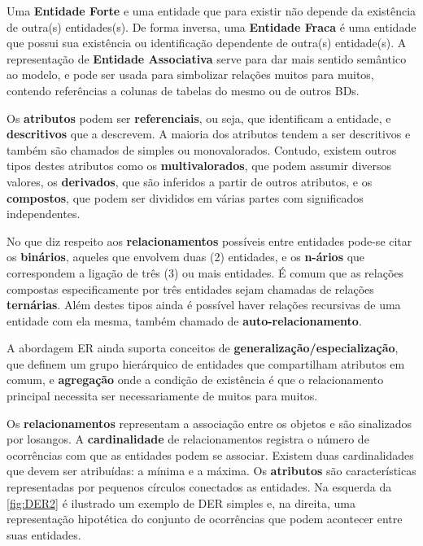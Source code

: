 Uma \textbf{Entidade Forte} e uma entidade que para existir não depende da existência de outra(s) entidades(s). 
De forma inversa, uma \textbf{Entidade Fraca} é uma entidade que possui sua existência ou identificação dependente de outra(s) entidade(s). 
A representação de \textbf{Entidade Associativa} serve para dar mais sentido semântico ao modelo, e pode ser usada para simbolizar relações muitos para muitos, contendo referências a colunas de tabelas do mesmo ou de outros \acp{BD}. 

Os \textbf{atributos} podem ser \textbf{referenciais}, ou seja, que identificam a entidade, e \textbf{descritivos} que a descrevem. 
A maioria dos atributos tendem a ser descritivos e também são chamados de simples ou monovalorados. 
Contudo, existem outros tipos destes atributos como os \textbf{multivalorados}, que podem assumir diversos valores, os \textbf{derivados}, que são inferidos a partir de outros atributos, e os \textbf{compostos}, que podem ser divididos em várias partes com significados independentes.

No que diz respeito aos \textbf{relacionamentos} possíveis entre entidades pode-se citar os \textbf{binários}, aqueles que envolvem duas (2) entidades, e os \textbf{n-ários} que correspondem a ligação de três (3) ou mais entidades. 
É comum que as relações compostas especificamente por três entidades sejam chamadas de relações \textbf{ternárias}. 
Além destes tipos ainda é possível haver relações recursivas de uma entidade com ela mesma, também chamado de \textbf{auto-relacionamento}.

A abordagem \ac{ER} ainda suporta conceitos de \textbf{generalização/especialização}, que definem um grupo hierárquico de entidades que compartilham atributos em comum, e \textbf{agregação} onde a condição de existência é que o relacionamento principal necessita ser necessariamente de muitos para muitos.

Os \textbf{relacionamentos} representam a associação entre os objetos e são sinalizados por losangos. 
A \textbf{cardinalidade} de relacionamentos registra o número de ocorrências com que as entidades podem se associar. 
Existem duas cardinalidades que devem ser atribuídas: a mínima e a máxima. Os \textbf{atributos} são características representadas por pequenos círculos conectados as entidades. 
Na esquerda da \autoref{fig:DER2} é ilustrado um exemplo de \ac{DER} simples e, na direita, uma representação hipotética do conjunto de ocorrências que podem acontecer entre suas entidades. 

